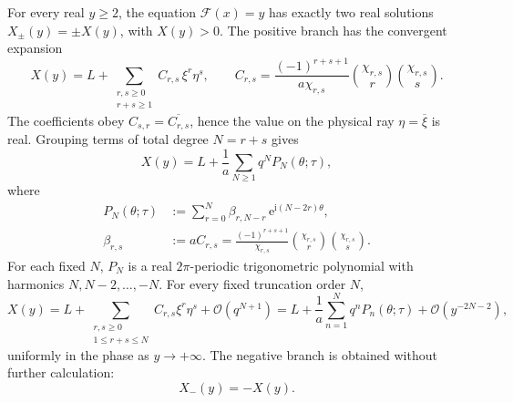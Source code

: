 \documentclass[11pt,oneside]{article}
\numberwithin{equation}{section}
\newcommand{\e}{\mathrm{e}}
\newcommand{\ii}{\mathrm{i}}
\newcommand{\cF}{\mathcal{F}}
\newcommand{\bigO}{\mathcal{O}}
\begin{document}
\begin{resultbox}
For every real \(y\ge2\), the equation \(\cF(x)=y\) has exactly two real solutions
\(X_\pm(y)=\pm X(y)\), with \(X(y)>0\).  The positive branch has the convergent
expansion
\begin{equation}
 \boxed{
  X(y)=L+\sum_{\substack{r,s\ge0\\r+s\ge1}}
  C_{r,s}\,\xi^r\eta^s,
  \qquad
  C_{r,s}=\frac{(-1)^{r+s+1}}{a\chi_{r,s}}
  \binom{\chi_{r,s}}r\binom{\chi_{r,s}}s .
 }
 \label{eq:main-complex}
\end{equation}
The coefficients obey \(C_{s,r}=\overline{C_{r,s}}\), hence the value on the
physical ray \(\eta=\overline\xi\) is real.  Grouping terms of total degree
\(N=r+s\) gives
\begin{equation}
 \boxed{
  X(y)=L+\frac1a\sum_{N\ge1}q^N P_N(\theta;\tau),
 }
 \label{eq:main-block}
\end{equation}
where
\begin{align}
 P_N(\theta;\tau)
   &:=\sum_{r=0}^{N}\beta_{r,N-r}\,
       \e^{\ii(N-2r)\theta},
 \label{eq:PN-def}\\
 \beta_{r,s}
   &:=aC_{r,s}
    =\frac{(-1)^{r+s+1}}{\chi_{r,s}}
      \binom{\chi_{r,s}}r\binom{\chi_{r,s}}s.
 \label{eq:beta-def}
\end{align}
For each fixed \(N\), \(P_N\) is a real \(2\pi\)-periodic trigonometric
polynomial with harmonics \(N,N-2,\ldots,-N\).  For every fixed truncation
order \(N\),
\begin{equation}
 X(y)=L+\sum_{\substack{r,s\ge0\\1\le r+s\le N}}
 C_{r,s}\xi^r\eta^s+\bigO(q^{N+1})
 =L+\frac1a\sum_{n=1}^{N}q^nP_n(\theta;\tau)
  +\bigO(y^{-2N-2}),
 \label{eq:uniform-remainder}
\end{equation}
uniformly in the phase as \(y\to+\infty\).  The negative branch is obtained
without further calculation:
\begin{equation}
  X_-(y)=-X(y).
\end{equation}
\end{resultbox}
\end{document}
